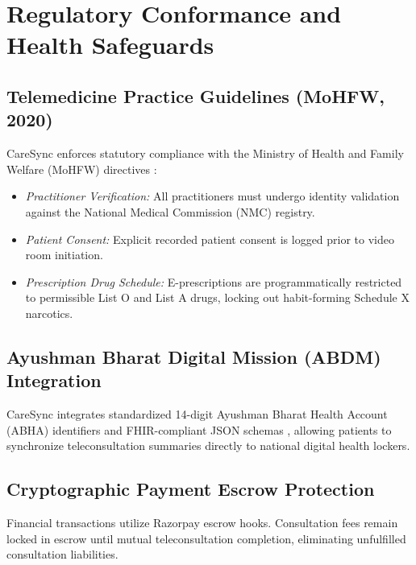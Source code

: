 \documentclass[conference]{IEEEtran}
\begin{document}
\section{Regulatory Conformance and Health Safeguards}

\subsection{Telemedicine Practice Guidelines (MoHFW, 2020)}
CareSync enforces statutory compliance with the Ministry of Health and Family Welfare (MoHFW) directives \cite{mohfw2020}:
\begin{itemize}
    \item \textit{Practitioner Verification:} All practitioners must undergo identity validation against the National Medical Commission (NMC) registry.
    \item \textit{Patient Consent:} Explicit recorded patient consent is logged prior to video room initiation.
    \item \textit{Prescription Drug Schedule:} E-prescriptions are programmatically restricted to permissible List O and List A drugs, locking out habit-forming Schedule X narcotics.
\end{itemize}

\subsection{Ayushman Bharat Digital Mission (ABDM) Integration}
CareSync integrates standardized 14-digit Ayushman Bharat Health Account (ABHA) identifiers and FHIR-compliant JSON schemas \cite{abdm2022, fhir2022}, allowing patients to synchronize teleconsultation summaries directly to national digital health lockers.

\subsection{Cryptographic Payment Escrow Protection}
Financial transactions utilize Razorpay escrow hooks. Consultation fees remain locked in escrow until mutual teleconsultation completion, eliminating unfulfilled consultation liabilities.
\end{document}
